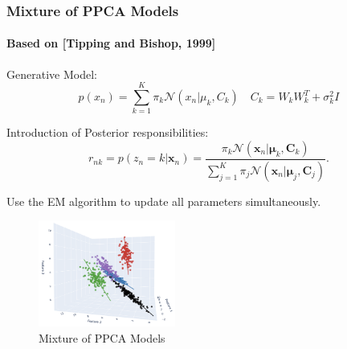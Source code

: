 \documentclass{beamer}
\begin{document}



\begin{frame}
    \frametitle{Mixture of PPCA Models}
    \framesubtitle{\footnotesize Based on [Tipping and Bishop, 1999]}

    Generative Model:
    \[
     p(x_n) = \sum_{k=1}^K \pi_k \mathcal{N}(x_n|\mu_k, C_k) \quad C_k = W_kW_k^T + \sigma_k^2I
    \]
    
    Introduction of Posterior responsibilities:
    \[
     r_{nk} = p(z_n = k | \mathbf{x}_n) = \frac{\pi_k \mathcal{N}(\mathbf{x}_n | \boldsymbol{\mu}_k, \mathbf{C}_k)}{\sum_{j=1}^K \pi_j \mathcal{N}(\mathbf{x}_n | \boldsymbol{\mu}_j, \mathbf{C}_j)}.
    \]
    
    Use the EM algorithm to update all parameters simultaneously.
    
    \begin{figure}[b]
        \centering
        \includegraphics[width=0.4\textwidth]{3dcluster.png} %
        \caption{Mixture of PPCA Models}
    \end{figure}
    
    \end{frame}
\end{document}
